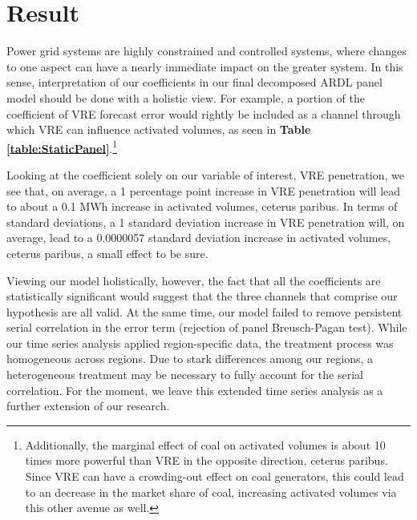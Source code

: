 \documentclass[12pt]{article}
\begin{document}
\section{Result}
\label{section:Result}
Power grid systems are highly constrained and controlled systems, where changes to one aspect can have a nearly immediate impact on the greater system. In this sense, interpretation of our coefficients in our final decomposed ARDL panel model should be done with a holistic view. For example, a portion of the coefficient of VRE forecast error would rightly be included as a channel through which VRE can influence activated volumes, as seen in \textbf{Table \ref{table:StaticPanel}}.\footnote{Additionally, the marginal effect of coal on activated volumes is about 10 times more powerful than VRE in the opposite direction, ceterus paribus. Since VRE can have a crowding-out effect on coal generators, this could lead to an decrease in the market share of coal, increasing activated volumes via this other avenue as well.}\par
Looking at the coefficient solely on our variable of interest, VRE penetration, we see that, on average, a 1 percentage point increase in VRE penetration will lead to about a 0.1 MWh increase in activated volumes, ceterus paribus. In terms of standard deviations, a 1 standard deviation increase in VRE penetration will, on average, lead to a 0.0000057 standard deviation increase in activated volumes, ceterus paribus, a small effect to be sure. \par
Viewing our model holistically, however, the fact that all the coefficients are statistically significant would suggest that the three channels that comprise our hypothesis are all valid. At the same time, our model failed to remove persistent serial correlation in the error term (rejection of panel Breusch-Pagan test). While our time series analysis applied region-specific data, the treatment process was homogeneous across regions. Due to stark differences among our regions, a heterogeneous treatment may be necessary to fully account for the serial correlation. For the moment, we leave this extended time series analysis as a further extension of our research.
\end{document}
